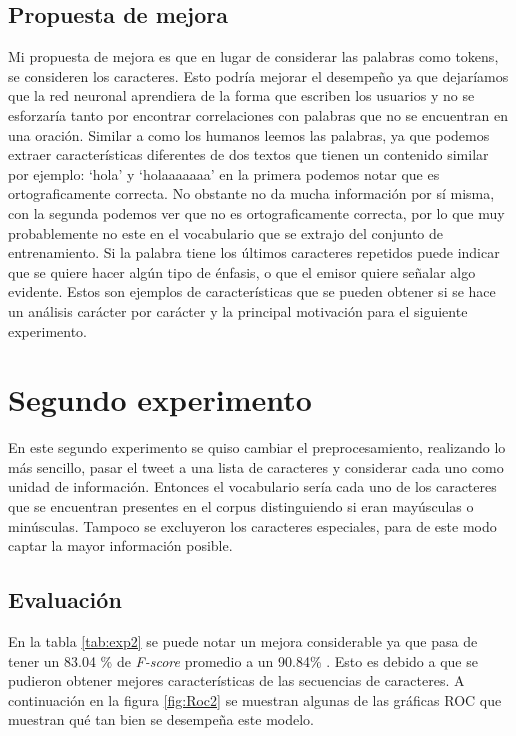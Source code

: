 \subsection{Propuesta de mejora}

\par Mi propuesta de mejora es que en lugar de considerar las palabras como tokens, se consideren los caracteres. Esto podría mejorar el desempeño ya que dejaríamos que la red neuronal aprendiera de la forma que escriben los usuarios y no se esforzaría tanto por encontrar correlaciones con palabras que no se encuentran en una oración. Similar a como los humanos leemos las palabras, ya que podemos extraer características diferentes de dos textos que tienen un contenido similar por ejemplo: `hola' y `holaaaaaaa' en la primera podemos notar que es ortograficamente correcta. No obstante no da mucha información por sí misma, con la segunda podemos ver que no es ortograficamente correcta, por lo que muy probablemente no este en el vocabulario que se extrajo del conjunto de entrenamiento. Si la palabra tiene los últimos caracteres repetidos puede indicar que se quiere hacer algún tipo de énfasis, o que el emisor quiere señalar algo evidente. Estos son ejemplos de características que se pueden obtener si se hace un análisis carácter por carácter y la principal motivación para el siguiente experimento.

\section{Segundo experimento}
\par En este segundo experimento se quiso cambiar el preprocesamiento, realizando lo más sencillo, pasar el tweet a una lista de caracteres y considerar cada uno como unidad de información. Entonces el vocabulario sería cada uno de los caracteres que se encuentran presentes en el corpus distinguiendo si eran mayúsculas o minúsculas. Tampoco se excluyeron los caracteres especiales, para de este modo captar la mayor información posible.
\subsection{Evaluación}
\begin{center}
	
\end{center}


\par En la tabla \ref{tab:exp2} se puede notar un mejora considerable ya que pasa de tener un 83.04 \% de \textit{F-score} promedio a un 90.84\% . Esto es debido a que se pudieron obtener mejores características de las secuencias de caracteres. A continuación en la figura \ref{fig:Roc2} se muestran algunas de las gráficas ROC que muestran qué tan bien se desempeña este modelo.

